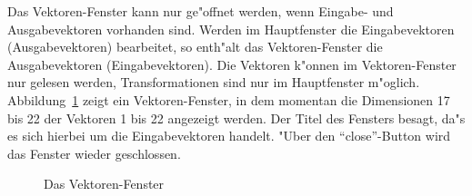 Das Vektoren-Fenster kann nur ge"offnet werden, wenn Eingabe- und 
Ausgabevektoren vorhanden sind. 
Werden im Hauptfenster die Eingabevektoren (Ausgabevektoren) bearbeitet, 
so enth"alt das Vektoren-Fenster die Ausgabevektoren (Eingabevektoren).
Die Vektoren k"onnen im Vektoren-Fenster nur gelesen werden, 
Transformationen sind nur im Hauptfenster m"oglich.
Abbildung~\ref{vektorfenster} zeigt ein Vektoren-Fenster, in dem
momentan die Dimensionen 17 bis 22 der Vektoren 1 bis 22 angezeigt werden.
Der Titel des Fensters besagt, da"s es sich hierbei um die
Eingabevektoren handelt. 
"Uber den "`close"'-Button wird das Fenster wieder geschlossen. 

\begin{figure}[ht]
\centerline{}
\caption{\label{vektorfenster} Das Vektoren-Fenster}
\end{figure}




